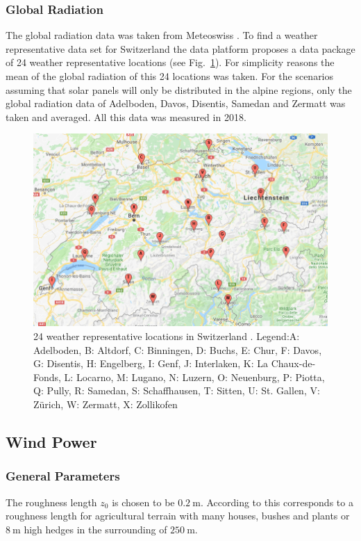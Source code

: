 \subsubsection{Global Radiation}
The global radiation data was taken from Meteoswiss \cite{idaweb}. To find a weather representative data set for Switzerland the data platform proposes a data package of 24 weather representative locations (see Fig.~\ref{fig:24Locations}). For simplicity reasons the mean of the global radiation of this 24 locations was taken. 
For the scenarios assuming that solar panels will only be distributed in the alpine regions, only the global radiation data of Adelboden, Davos, Disentis, Samedan and Zermatt was taken and averaged. All this data was measured in 2018.

\begin{figure}
    \centering
    \includegraphics[width = \textwidth]{figures/24_Locations.jpg}
    \caption{24 weather representative locations in Switzerland \cite{batchgeo}. Legend:\newline A:	Adelboden, B: Altdorf, C: Binningen, D: Buchs, E: Chur, F: Davos, G: Disentis, H: Engelberg, I: Genf, J: Interlaken, K: La Chaux-de-Fonds, L: Locarno, M: Lugano, N: Luzern, O: Neuenburg, P: Piotta, Q: Pully, R: Samedan, S: Schaffhausen, T: Sitten, U: St. Gallen, V: Zürich, W: Zermatt, X: Zollikofen}
    \label{fig:24Locations}
\end{figure}

\subsection{Wind Power}
\subsubsection{General Parameters}
The roughness length $z_0$ is chosen to be $\SI{0.2}{\m}$. According to \cite{windspeed} this corresponds to a roughness length for agricultural terrain with many houses, bushes and plants or $\SI{8}{\m}$ high hedges in the surrounding of $\SI{250}{\m}$. 

